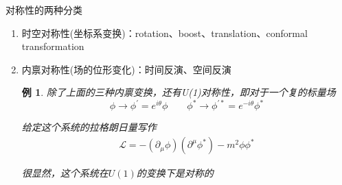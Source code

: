 \documentclass{article}
\newtheorem{example}{例}
\begin{document}
对称性的两种分类
\begin{enumerate}
    \item 时空对称性(坐标系变换)：rotation、boost、translation、conformal transformation
    \item 内禀对称性(场的位形变化)：时间反演、空间反演
    
    \begin{example}
        除了上面的三种内禀变换，还有U(1)对称性，即对于一个复的标量场
        \begin{equation*}
            \phi\to\phi^\prime=e^{i\theta}\phi\quad\quad\phi^*\to\phi^{\prime*}=e^{-i\theta}\phi^*
        \end{equation*}

        给定这个系统的拉格朗日量写作
        \begin{align*}
            \mathcal{L}=-(\partial_\mu\phi)(\partial^\mu\phi^*)-m^2\phi\phi^*
        \end{align*}

        很显然，这个系统在$U(1)$的变换下是对称的
    \end{example}
\end{enumerate}
\end{document}
